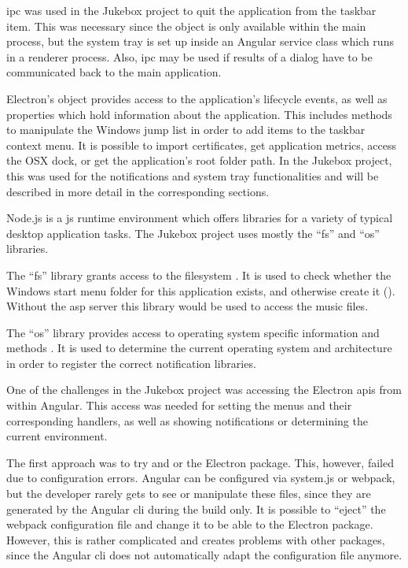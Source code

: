 \gls{ipc} was used in the Jukebox project to quit the application from the taskbar item. This was necessary since the  object is only available within the main process, but the system tray is set up inside an Angular service class which runs in a renderer process. Also, \gls{ipc} may be used if results of a dialog have to be communicated back to the main application.


Electron's  object provides access to the application's lifecycle events, as well as properties which hold information about the application. This includes methods to manipulate the Windows jump list in order to add items to the taskbar context menu. It is possible to import certificates, get application metrics, access the OSX dock, or get the application's root folder path. In the Jukebox project, this was used for the notifications and system tray functionalities and will be described in more detail in the corresponding sections.


Node.js is a \gls{js} runtime environment which offers libraries for a variety of typical desktop application tasks. The Jukebox project uses mostly the \enquote{fs} and \enquote{os} libraries.

The \enquote{fs} library grants access to the filesystem \cite{nodejsFS}. It is used to check whether the Windows start menu folder for this application exists, and otherwise create it (). Without the \gls{asp} server this library would  be used to access the music files.

The \enquote{os} library provides access to operating system specific information and methods \cite{nodejsOS}. It is used to determine the current operating system and architecture in order to register the correct notification libraries.


One of the challenges in the Jukebox project was accessing the Electron \gls{api}s from within Angular. This access was needed for setting the menus and their corresponding  handlers, as well as showing notifications or determining the current environment.


The first approach was to try and  or  the Electron package. This, however, failed due to configuration errors. Angular can be configured via system.js or webpack, but the developer rarely gets to see or manipulate these files, since they are generated by the Angular \gls{cli} during the build only. It is possible to \enquote{eject} the webpack configuration file and change it to be able to  the Electron package. However, this is rather complicated and creates problems with other packages, since the Angular \gls{cli} does not automatically adapt the configuration file anymore. \cite{electronRequireError}

